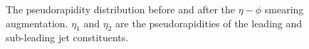\documentclass[12pt]{article}
\begin{document}
        \begin{figure}[htpb]
            \centering
            \caption{The pseudorapidity distribution before and after the $\eta-\phi$ smearing augmentation. $\eta_1$ and $\eta_2$ are the pseudorapidities of the leading and sub-leading jet constituents.}
            \label{fig:jet_constituent_eta_distribution}
        \end{figure}
\end{document}
